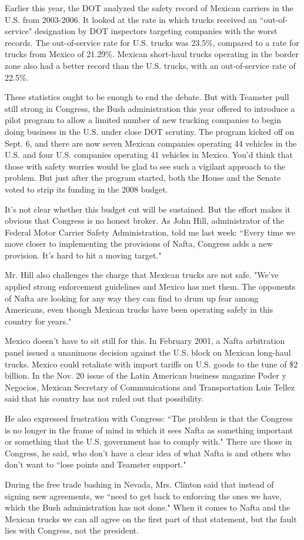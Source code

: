 \documentclass[letterpaper,12pt]{article}
\begin{document}
Earlier this year, the DOT analyzed the safety record of Mexican 
carriers in the U.S. from 2003-2006. It looked at the rate in which 
trucks received an ``out-of-service" designation by DOT inspectors 
targeting companies with the worst records. The out-of-service rate 
for U.S. trucks was 23.5\%, compared to a rate for trucks from 
Mexico of 21.29\%. Mexican short-haul trucks operating in the border 
zone also had a better record than the U.S. trucks, with an 
out-of-service rate of 22.5\%.

These statistics ought to be enough to end the debate. But with 
Teamster pull still strong in Congress, the Bush administration this 
year offered to introduce a pilot program to allow a limited number 
of new trucking companies to begin doing business in the U.S. under 
close DOT scrutiny. The program kicked off on Sept. 6, and there are 
now seven Mexican companies operating 44 vehicles in the U.S. and 
four U.S. companies operating 41 vehicles in Mexico. You'd think 
that those with safety worries would be glad to see such a vigilant 
approach to the problem. But just after the program started, both 
the House and the Senate voted to strip its funding in the 2008 
budget.

It's not clear whether this budget cut will be sustained. But the 
effort makes it obvious that Congress is no honest broker. As John 
Hill, administrator of the Federal Motor Carrier Safety 
Administration, told me last week: ``Every time we move closer to 
implementing the provisions of Nafta, Congress adds a new provision. 
It's hard to hit a moving target."

Mr. Hill also challenges the charge that Mexican trucks are not 
safe. "We've applied strong enforcement guidelines and Mexico has 
met them. The opponents of Nafta are looking for any way they can 
find to drum up fear among Americans, even though Mexican trucks 
have been operating safely in this country for years."

Mexico doesn't have to sit still for this. In February 2001, a Nafta 
arbitration panel issued a unanimous decision against the U.S. block 
on Mexican long-haul trucks. Mexico could retaliate with import 
tariffs on U.S. goods to the tune of \$2 billion. In the Nov. 20 
issue of the Latin American business magazine Poder y Negocios, 
Mexican Secretary of Communications and Transportation Luis Tellez 
said that his country has not ruled out that possibility.

He also expressed frustration with Congress: ``The problem is that 
the Congress is no longer in the frame of mind in which it sees 
Nafta as something important or something that the U.S. government 
has to comply with." There are those in Congress, he said, who don't 
have a clear idea of what Nafta is and others who don't want to 
``lose points and Teamster support."


During the free trade bashing in Nevada, Mrs. Clinton said that 
instead of signing new agreements, we ``need to get back to 
enforcing the ones we have, which the Bush administration has not 
done." When it comes to Nafta and the Mexican trucks we can all 
agree on the first part of that statement, but the fault lies with 
Congress, not the president.
\end{document}
